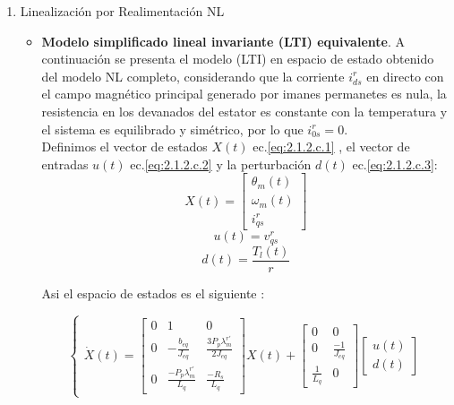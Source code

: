 \documentclass[10pt]{article}
\begin{document}
\begin{enumerate}
    \item Linealización por Realimentación NL
    \begin{itemize}
    
	\item\textbf{ Modelo simplificado lineal invariante (LTI) equivalente}.
	A continuación se presenta el modelo (LTI) en espacio de estado obtenido del modelo NL completo, considerando que la corriente  		$i^{r}_{ds}$ en directo con el campo magnético principal generado por imanes permanetes es nula, la resistencia en los 			devanados del estator es constante con la temperatura y el sistema es equilibrado y simétrico, por lo que  $i^{r}_{0s}=0$.\\
	Definimos el vector de estados $X(t)$ ec.\ref{eq:2.1.2.c.1} , el vector de entradas $u(t)$ ec.\ref{eq:2.1.2.c.2} y la perturbación 	$d(t)$ ec.\ref{eq:2.1.2.c.3}:
	\begin{equation}
		X(t)=\begin{bmatrix}
			\theta_{m}(t)\\
			\omega_{m}(t) 
			\\ 
			i^{r}_{qs}
		\end{bmatrix}
		\label{eq:2.1.2.c.1}
	\end{equation}
	\begin{equation}
		u(t)=v^{r}_{qs} 
		\label{eq:2.1.2.c.2}
	\end{equation}
	\begin{equation}
		d(t)=\frac{T_{l}(t)}{r} 
		\label{eq:2.1.2.c.3}
	\end{equation}
	
	Asi el espacio de estados es el siguiente  :
	
	\begin{equation}
	\begin{cases}
	\dot{X}(t)=\begin{bmatrix}
	0 & 1 &0 \\ 
	0 & -\frac{b_{eq}}{J_{eq}} & \frac{3 P_{p} \lambda^{r'}_{m}}{2 J_{eq}} \\ 
	0  & \frac{- P_{p} \lambda^{r'}_{m}}{ L_{q}} & \frac{-R_{s}}{L_{q}}
	\end{bmatrix} X(t) + \begin{bmatrix}
	0 &0 \\ 
	0 &\frac{-1}{J_{eq}} \\ 
	 \frac{1}{L_{q}}&0 
	\end{bmatrix} \begin{bmatrix}
	u(t)\\
	d(t) 
	

\end{bmatrix}
\end{cases}
\end{equation}
\end{itemize}
\end{enumerate}
\end{document}
